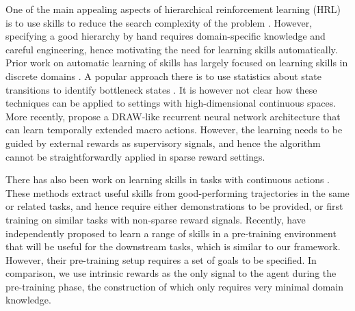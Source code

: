 \documentclass{article} %
\begin{document}
One of the main appealing aspects of hierarchical reinforcement learning (HRL) is to use skills to reduce the search complexity of the problem \citep{parr1998reinforcement, sutton1999between, dietterich2000hierarchical}.
However, specifying a good hierarchy by hand requires domain-specific knowledge and careful engineering, hence motivating the need for learning skills automatically. Prior work on automatic learning of skills has largely focused on learning skills in discrete domains \citep{chentanez2004intrinsically, vigorito2010intrinsically}.
A popular approach there is to use statistics about state transitions to identify bottleneck states \citep{stolle2002learning, mannor2004dynamic, csimcsek2005identifying}.
It is however not clear how these techniques can be applied to settings with high-dimensional continuous spaces.
More recently, \cite{mnih2016strategic} propose a DRAW-like \citep{gregor2015draw} recurrent neural network architecture that can learn temporally extended macro actions.
However, the learning needs to be guided by external rewards as supervisory signals, and hence the algorithm cannot be straightforwardly applied in sparse reward settings.%

There has also been work on learning skills in tasks with continuous actions  \citep{schaal2005learning, konidaris2011autonomous, daniel2013autonomous, ranchod2015nonparametric}.
These methods extract useful skills from good-performing trajectories in the same or related tasks, and hence require either demonstrations to be provided, or first training on similar tasks with non-sparse reward signals.
Recently, \cite{heess2016learning} have independently proposed to learn a range of skills in a pre-training environment that will be useful for the downstream tasks, which is similar to our framework.
However, their pre-training setup requires a set of goals to be specified.
In comparison, we use intrinsic rewards as the only signal to the agent during the pre-training phase, the construction of which only requires very minimal domain knowledge.%

\end{document}
